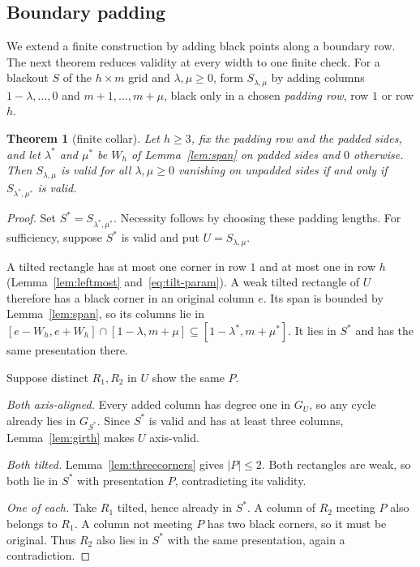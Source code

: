 \documentclass[12pt]{article}
\theoremstyle{plain}
\newtheorem{theorem}{Theorem}
\theoremstyle{definition}
\theoremstyle{remark}
\begin{document}
\subsection{Boundary padding}

We extend a finite construction by adding black points along a boundary row.
The next theorem reduces validity at every width to one finite check.
For a blackout $S$ of the $h\times m$ grid and $\lambda,\mu\ge0$, form $S_{\lambda,\mu}$ by
adding columns $1-\lambda,\dots,0$ and $m+1,\dots,m+\mu$, black only in a chosen
\emph{padding row}, row $1$ or row $h$.

\begin{theorem}[finite collar]\label{thm:collar}
Let $h\ge3$, fix the padding row and the padded sides, and let $\lambda^*$ and $\mu^*$ be $W_h$ of
Lemma~\ref{lem:span} on padded sides and $0$ otherwise. Then $S_{\lambda,\mu}$ is valid for all
$\lambda,\mu\ge0$ vanishing on unpadded sides if and only if $S_{\lambda^*,\mu^*}$ is valid.
\end{theorem}

\begin{proof}
Set $S^*=S_{\lambda^*,\mu^*}$. Necessity follows by choosing these padding lengths.
For sufficiency, suppose $S^*$ is valid and put $U=S_{\lambda,\mu}$.

A tilted rectangle has at most one corner in row $1$ and at most one
in row $h$ (Lemma~\ref{lem:leftmost} and~\eqref{eq:tilt-param}).
A weak tilted rectangle of $U$ therefore has a black corner in an
original column $e$. Its span is bounded by Lemma~\ref{lem:span}, so
its columns lie in $[e-W_h,e+W_h]\cap[1-\lambda,m+\mu]\subseteq[1-\lambda^*,m+\mu^*]$.
It lies in $S^*$ and has the same presentation there.

Suppose distinct $R_1,R_2$ in $U$ show the same $P$.

\emph{Both axis-aligned.} Every added column has degree one in $G_U$,
so any cycle already lies in $G_{S^*}$. Since $S^*$ is valid and has
at least three columns, Lemma~\ref{lem:girth} makes $U$ axis-valid.

\emph{Both tilted.} Lemma~\ref{lem:threecorners} gives $|P|\le2$.
Both rectangles are weak, so both lie in $S^*$ with presentation $P$,
contradicting its validity.

\emph{One of each.} Take $R_1$ tilted, hence already in $S^*$.
A column of $R_2$ meeting $P$ also belongs to $R_1$. A column not
meeting $P$ has two black corners, so it must be original.
Thus $R_2$ also lies in $S^*$ with the same presentation, again a
contradiction.
\end{proof}
\end{document}
